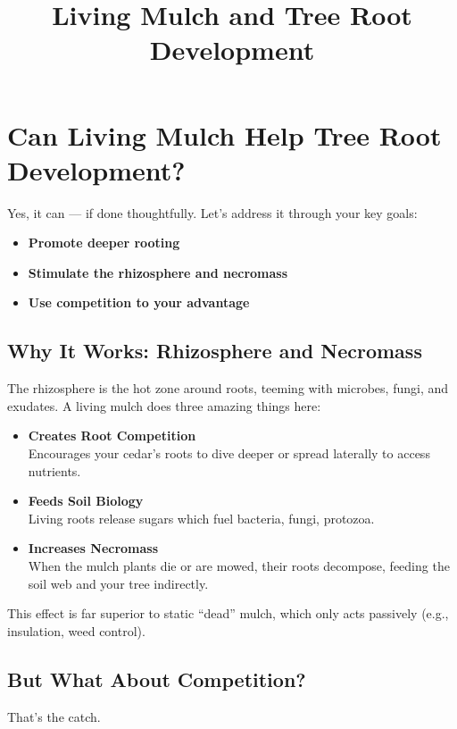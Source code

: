 \documentclass{article}
\title{Living Mulch and Tree Root Development}
\author{}
\date{}
\begin{document}
\maketitle

\section*{Can Living Mulch Help Tree Root Development?}
Yes, it can — if done thoughtfully. Let’s address it through your key goals:

\begin{itemize}
    \item \textbf{Promote deeper rooting}
    \item \textbf{Stimulate the rhizosphere and necromass}
    \item \textbf{Use competition to your advantage}
\end{itemize}

\subsection*{Why It Works: Rhizosphere and Necromass}
The rhizosphere is the hot zone around roots, teeming with microbes, fungi, and exudates. A living mulch does three amazing things here:

\begin{itemize}
    \item \textbf{Creates Root Competition} \\
    Encourages your cedar’s roots to dive deeper or spread laterally to access nutrients.
    \item \textbf{Feeds Soil Biology} \\
    Living roots release sugars which fuel bacteria, fungi, protozoa.
    \item \textbf{Increases Necromass} \\
    When the mulch plants die or are mowed, their roots decompose, feeding the soil web and your tree indirectly.
\end{itemize}

This effect is far superior to static “dead” mulch, which only acts passively (e.g., insulation, weed control).

\subsection*{But What About Competition?}
That’s the catch.
\end{document}
